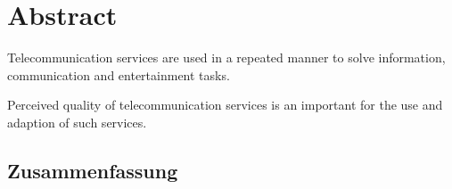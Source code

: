 \begingroup
\let\clearpage\relax
\let\cleardoublepage\relax
\let\cleardoublepage\relax

\chapter*{Abstract}
\begin{center}

Telecommunication services are used in a repeated manner to solve information, communication and entertainment tasks.

Perceived quality of telecommunication services is an important for the use and adaption of such services.



\end{center}

\vfill

\begin{otherlanguage}{ngerman}
\chapter*{Zusammenfassung}


\end{otherlanguage}
\endgroup			
\vfill